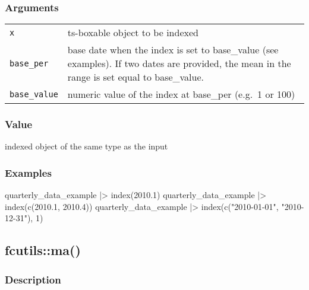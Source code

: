 \documentclass[
  letterpaper,
  DIV=11,
  numbers=noendperiod]{scrreport}
\newenvironment{Shaded}{\begin{snugshade}}{\end{snugshade}}
\newcommand{\DecValTok}[1]{\textcolor[rgb]{0.68,0.00,0.00}{#1}}
\newcommand{\FloatTok}[1]{\textcolor[rgb]{0.68,0.00,0.00}{#1}}
\newcommand{\FunctionTok}[1]{\textcolor[rgb]{0.28,0.35,0.67}{#1}}
\newcommand{\NormalTok}[1]{\textcolor[rgb]{0.00,0.23,0.31}{#1}}
\newcommand{\SpecialCharTok}[1]{\textcolor[rgb]{0.37,0.37,0.37}{#1}}
\newcommand{\StringTok}[1]{\textcolor[rgb]{0.13,0.47,0.30}{#1}}
\begin{document}
\subsubsection{Arguments}\label{arguments-36}

\begin{longtable}[]{@{}ll@{}}
\toprule\noalign{}
\endhead
\bottomrule\noalign{}
\endlastfoot
\texttt{x} & ts-boxable object to be indexed \\
\texttt{base\_per} & base date when the index is set to base\_value (see
examples). If two dates are provided, the mean in the range is set equal
to base\_value. \\
\texttt{base\_value} & numeric value of the index at base\_per (e.g.~1
or 100) \\
\end{longtable}

\subsubsection{Value}\label{value-36}

indexed object of the same type as the input

\subsubsection{Examples}\label{examples-36}

\begin{Shaded}
\begin{Highlighting}[]
\NormalTok{quarterly\_data\_example }\SpecialCharTok{|\textgreater{}}
  \FunctionTok{index}\NormalTok{(}\FloatTok{2010.1}\NormalTok{)}
\NormalTok{quarterly\_data\_example }\SpecialCharTok{|\textgreater{}}
  \FunctionTok{index}\NormalTok{(}\FunctionTok{c}\NormalTok{(}\FloatTok{2010.1}\NormalTok{, }\FloatTok{2010.4}\NormalTok{))}
\NormalTok{quarterly\_data\_example }\SpecialCharTok{|\textgreater{}}
  \FunctionTok{index}\NormalTok{(}\FunctionTok{c}\NormalTok{(}\StringTok{"2010{-}01{-}01"}\NormalTok{, }\StringTok{"2010{-}12{-}31"}\NormalTok{), }\DecValTok{1}\NormalTok{)}
\end{Highlighting}
\end{Shaded}

\subsection{fcutils::ma()}\label{fcutilsma}

\subsubsection{Description}\label{description-37}
\end{document}
